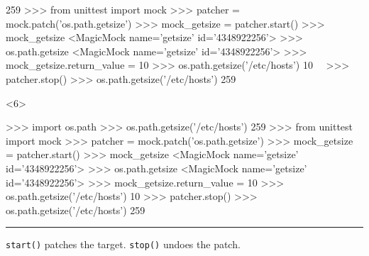 \documentclass[xcolor={svgnames}]{beamer}
\newcommand{\pycode}[2][]{\lstinline[style=python,#1]{#2}}
\newcommand{\hr}[2]{\vspace{#1}\hrule height 0.01mm\vspace{#2}}
\begin{document}
\begin{frame}[t,fragile]
\begin{onlyenv}
\begin{pyenv}[gobble=12]
            259
            >>> from unittest import mock
            >>> patcher = mock.patch('os.path.getsize')
            >>> mock_getsize = patcher.start()
            >>> mock_getsize
            <MagicMock name='getsize' id='4348922256'>
            >>> os.path.getsize
            <MagicMock name='getsize' id='4348922256'>
            >>> mock_getsize.return_value = 10
            >>> os.path.getsize('/etc/hosts')
            10~~
            >>> patcher.stop()
            >>> os.path.getsize('/etc/hosts')
            259
        \end{pyenv}
    \end{onlyenv}
    \begin{onlyenv}<6>
        \begin{pyenv}[gobble=12]
            >>> import os.path
            >>> os.path.getsize('/etc/hosts')
            259
            >>> from unittest import mock
            >>> patcher = mock.patch('os.path.getsize')
            >>> mock_getsize = patcher.start()
            >>> mock_getsize
            <MagicMock name='getsize' id='4348922256'>
            >>> os.path.getsize
            <MagicMock name='getsize' id='4348922256'>
            >>> mock_getsize.return_value = 10
            >>> os.path.getsize('/etc/hosts')
            10
            >>> patcher.stop()
            >>> os.path.getsize('/etc/hosts')
            259
        \end{pyenv}
        \hr{-1mm}{-1mm}
        \pycode{start()} patches the target.
        \pycode{stop()} undoes the patch.
    \end{onlyenv}
\end{frame}
\end{document}
